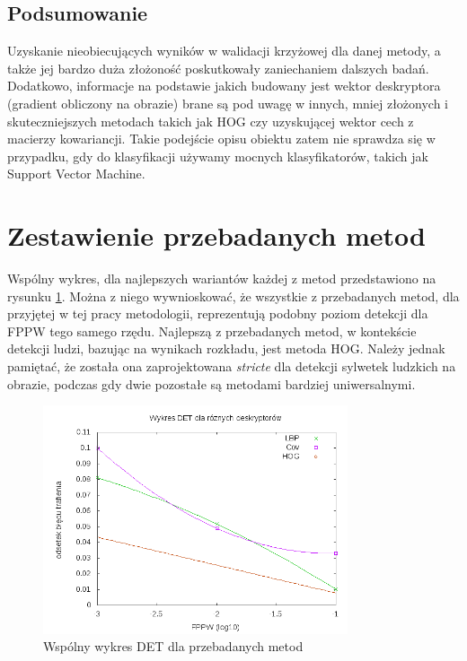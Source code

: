 \subsection{Podsumowanie}
Uzyskanie nieobiecujących wyników w walidacji krzyżowej dla danej metody, a także jej bardzo duża złożoność poskutkowały zaniechaniem dalszych badań. Dodatkowo, informacje na podstawie jakich budowany jest wektor deskryptora (gradient obliczony na obrazie) brane są pod uwagę w innych, mniej złożonych i skuteczniejszych metodach takich jak HOG czy uzyskującej wektor cech z macierzy kowariancji. Takie podejście opisu obiektu zatem nie sprawdza się w przypadku, gdy do klasyfikacji używamy mocnych klasyfikatorów, takich jak Support Vector Machine.

\section{Zestawienie przebadanych metod}

Wspólny wykres, dla najlepszych wariantów każdej z metod przedstawiono na rysunku \ref{fig:joint_det}. Można z niego wywnioskować, że wszystkie z przebadanych metod, dla przyjętej w tej pracy metodologii, reprezentują podobny poziom detekcji dla FPPW tego samego rzędu. Najlepszą z przebadanych metod, w kontekście detekcji ludzi, bazując na wynikach rozkładu, jest metoda HOG. Należy jednak pamiętać, że została ona zaprojektowana \textit{stricte} dla detekcji sylwetek ludzkich na obrazie, podczas gdy dwie pozostałe są metodami bardziej uniwersalnymi.

\begin{figure}[htb]
\centering
\includegraphics[width=0.8\textwidth]{joint_det.png}
\caption{Wspólny wykres DET dla przebadanych metod}
\label{fig:joint_det}
\end{figure}